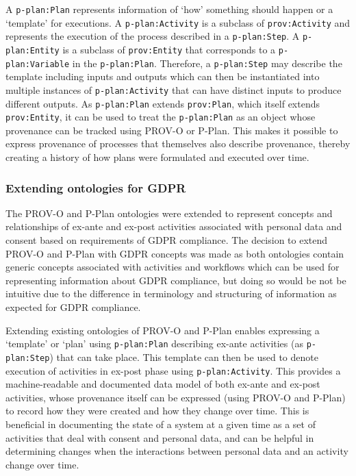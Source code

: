 A \texttt{p-plan:Plan} represents information of `how’ something should happen or a `template’ for executions. A \texttt{p-plan:Activity} is a subclass of \texttt{prov:Activity} and represents the execution of the process described in a \texttt{p-plan:Step}.
A \texttt{p-plan:Entity} is a subclass of \texttt{prov:Entity} that corresponds to a \texttt{p-plan:Variable} in the \texttt{p-plan:Plan}. Therefore, a
\texttt{p-plan:Step} may describe the template including inputs and outputs which can
then be instantiated into multiple instances of \texttt{p-plan:Activity} that can have
distinct inputs to produce different outputs.
As \texttt{p-plan:Plan} extends \texttt{prov:Plan}, which itself extends \texttt{prov:Entity}, it can be
used to treat the \texttt{p-plan:Plan} as an object whose provenance can be tracked using
PROV-O or P-Plan. This makes it possible to express provenance of processes that themselves also describe provenance, thereby creating a history of how plans were formulated and executed over time.

\subsubsection{Extending ontologies for GDPR}
The PROV-O and P-Plan ontologies were extended to represent concepts and relationships of ex-ante and ex-post activities associated with personal data and consent based on requirements of GDPR compliance.
The decision to extend PROV-O and P-Plan with GDPR concepts was made as both ontologies contain generic concepts associated with activities and workflows which can be used for representing information about GDPR compliance, but doing so would be not be intuitive due to the difference in terminology and structuring of information as expected for GDPR compliance.

Extending existing ontologies of PROV-O and P-Plan enables expressing a `template'
or `plan' using \texttt{p-plan:Plan} describing ex-ante activities (as \texttt{p-plan:Step}) that can take place. This template can then be used to denote execution of activities in ex-post phase using \texttt{p-plan:Activity}.
This provides a machine-readable and documented data model of both ex-ante and ex-post activities, whose provenance itself can be expressed (using PROV-O and P-Plan) to record how they were created and how they  change over time.
This is beneficial in documenting the state of a system at a given time as a set of activities that deal with consent and personal data, and
can be helpful in determining changes when the interactions between personal data and an activity change over time.

